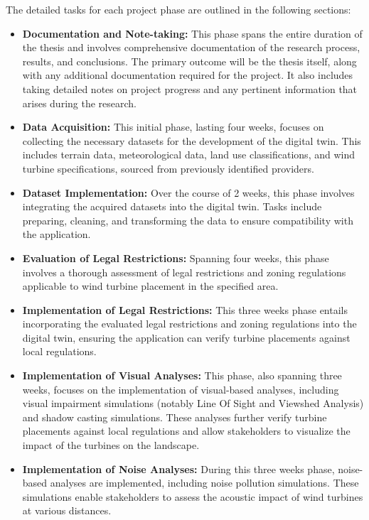 \documentclass[11pt, titlepage, a4paper]{scrartcl}
\begin{document}
\begin{linenumbers}
The detailed tasks for each project phase are outlined in the following sections:

\begin{itemize}
    \item \textbf{Documentation and Note-taking:} This phase spans the entire duration of the thesis and involves comprehensive documentation of the research process, results, and conclusions. The primary outcome will be the thesis itself, along with any additional documentation required for the project. It also includes taking detailed notes on project progress and any pertinent information that arises during the research.
    \item \textbf{Data Acquisition:} This initial phase, lasting four weeks, focuses on collecting the necessary datasets for the development of the digital twin. This includes terrain data, meteorological data, land use classifications, and wind turbine specifications, sourced from previously identified providers.
    \item \textbf{Dataset Implementation:} Over the course of 2 weeks, this phase involves integrating the acquired datasets into the digital twin. Tasks include preparing, cleaning, and transforming the data to ensure compatibility with the application.
    \item \textbf{Evaluation of Legal Restrictions:} Spanning four weeks, this phase involves a thorough assessment of legal restrictions and zoning regulations applicable to wind turbine placement in the specified area.
    \item \textbf{Implementation of Legal Restrictions:} This three weeks phase entails incorporating the evaluated legal restrictions and zoning regulations into the digital twin, ensuring the application can verify turbine placements against local regulations.
    \item \textbf{Implementation of Visual Analyses:} This phase, also spanning three weeks, focuses on the implementation of visual-based analyses, including visual impairment simulations (notably Line Of Sight and Viewshed Analysis) and shadow casting simulations. These analyses further verify turbine placements against local regulations and allow stakeholders to visualize the impact of the turbines on the landscape.
    \item \textbf{Implementation of Noise Analyses:} During this three weeks phase, noise-based analyses are implemented, including noise pollution simulations. These simulations enable stakeholders to assess the acoustic impact of wind turbines at various distances.

\end{itemize}
\end{linenumbers}
\end{document}
